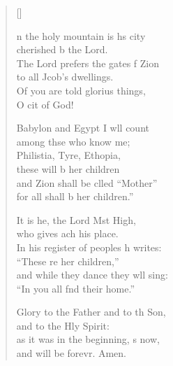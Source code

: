 \settowidth{\versewidth}{In his register of peoples he writes: *}
\begin{verse}[\versewidth]
  \begin{patverse}
n the holy mountain is h\pointup{\i}s city\Med\\
cherished b the Lord.\\
The Lord prefers the gates f Zion\Med\\
to all Jcob’s dwellings.\\
Of you are told glorius things,\Med\\
O cit of God!

Babylon and Egypt I w\pointup{\i}ll count\Med\\
among thse who know me;\\
Philistia, Tyre, Eth\pointup{\i}opia,\Med\\
these will b her children\\
and Zion shall be clled “Mother”\Med\\
for all shall b her children.”

It is he, the Lord Mst High,\Med\\
who gives ach his place.\\
In his register of peoples h writes:\Med\\
“These re her children,”\\
and while they dance they w\pointup{\i}ll sing:\Med\\
“In you all f\pointup{\i}nd their home.”

Glory to the Father and to th Son,\Med\\
and to the Hly Spirit:\\
as it was in the beginning, \pointup{\i}s now,\Med\\
and will be forevr. Amen.
  \end{patverse}
\end{verse}
